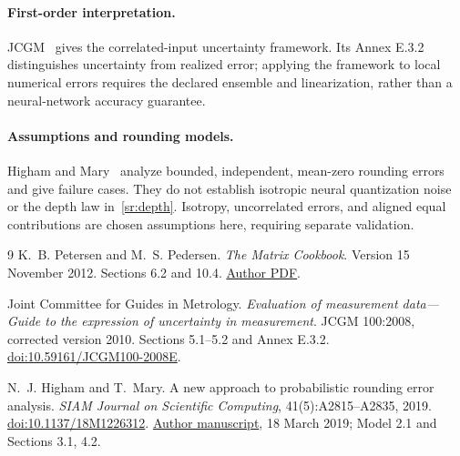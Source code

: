 \documentclass[10pt,a4paper]{article}
\begin{document}
\paragraph{First-order interpretation.}
JCGM~\cite{jcgm2008gum} gives the correlated-input uncertainty framework.
Its Annex E.3.2 distinguishes uncertainty from realized error; applying
the framework to local numerical errors requires the declared ensemble
and linearization, rather than a neural-network accuracy guarantee.

\paragraph{Assumptions and rounding models.}
Higham and Mary~\cite[Model 2.1; Sections 3.1, 4.2]{higham2019probabilistic}
analyze bounded, independent, mean-zero rounding errors and give failure cases.
They do not establish isotropic neural quantization noise or the depth law
in~\eqref{sr:depth}. Isotropy, uncorrelated errors, and aligned equal
contributions are chosen assumptions here, requiring separate validation.

\renewcommand{\refname}{References}
\begin{thebibliography}{9}
K.~B. Petersen and M.~S. Pedersen.
\emph{The Matrix Cookbook}. Version 15 November 2012.
Sections 6.2 and 10.4.
\href{https://www2.imm.dtu.dk/pubdb/edoc/imm3274.pdf}{Author PDF}.

Joint Committee for Guides in Metrology.
\emph{Evaluation of measurement data---Guide to the expression of
uncertainty in measurement}. JCGM 100:2008, corrected version 2010.
Sections 5.1--5.2 and Annex E.3.2.
\href{https://doi.org/10.59161/JCGM100-2008E}{doi:10.59161/JCGM100-2008E}.

N.~J. Higham and T.~Mary.
A new approach to probabilistic rounding error analysis.
\emph{SIAM Journal on Scientific Computing}, 41(5):A2815--A2835, 2019.
\href{https://doi.org/10.1137/18M1226312}{doi:10.1137/18M1226312}.
\href{https://eprints.maths.manchester.ac.uk/2731/1/paper.pdf}{Author manuscript},
18 March 2019; Model 2.1 and Sections 3.1, 4.2.
\end{thebibliography}
\end{document}
